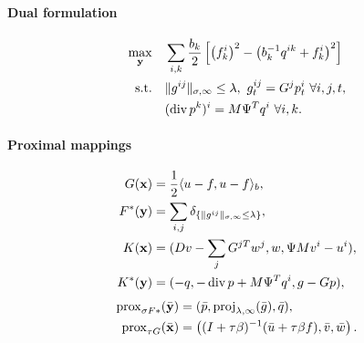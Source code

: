 \paragraph{Dual formulation}
\begin{align*}
    \max_{\mathbf{y}} \quad
        & \sum_{i,k} \frac{b_k}{2} \left [
                \left(f_k^i\right)^2
                - \left(b_k^{-1} q^{ik} + f_k^i\right)^2
            \right ] \\
    \text{s.t.}\quad
        & \|g^{ij}\|_{\sigma,\infty} \leq \lambda,
          ~g^{ij}_t = G^j p^i_t ~\forall i,j,t, \\
        & (\operatorname{div} p^k)^i = M \Psi^T q^i ~\forall i,k.
\end{align*}

\paragraph{Proximal mappings}
\begin{align*}
    G(\mathbf{x}) &= \frac{1}{2} \langle u-f, u-f \rangle_b, \\
    F^*(\mathbf{y}) &=
        \sum_{i,j} \delta_{\{\|g^{ij}\|_{\sigma,\infty} \leq \lambda\}}, \\
    K(\mathbf{x}) &= (
        Dv - \sum_j G^{jT}w^{j},
        w,
        \Psi M v^i - u^i
    ), \\
    K^*(\mathbf{y}) &= (
        -q,
        -\operatorname{div}{p} + M \Psi^T q^i,
        g - Gp
    ),
\end{align*}
\begin{align*}
    \operatorname{prox}_{\sigma F*}(\bar{\mathbf{y}})
    &= (
        \bar{p},
        \operatorname{proj}_{\lambda,\infty}(\bar{g}),
        \bar{q}
    ), \\
    \operatorname{prox}_{\tau G}(\bar{\mathbf{x}})
    &= \left(
        (I+\tau \beta)^{-1}(\bar{u} + \tau \beta f),
        \bar{v},
        \bar{w}
    \right).
\end{align*}

